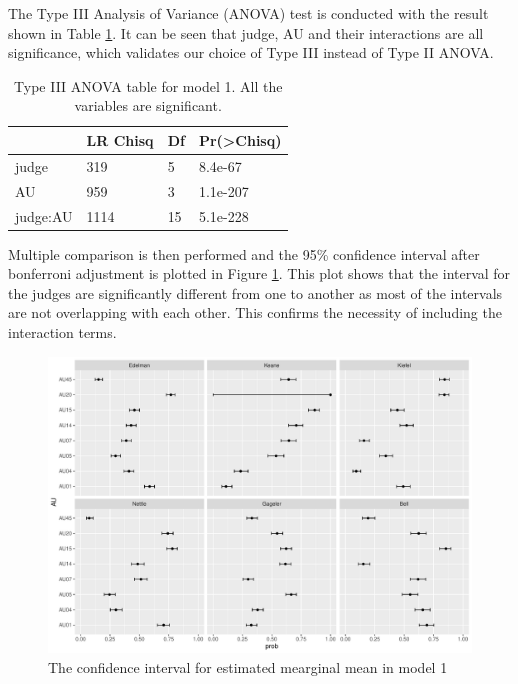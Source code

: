 \documentclass{monashthesis}
\begin{document}
The Type III Analysis of Variance (ANOVA) test is conducted with the result shown in Table \ref{tab:anova}. It can be seen that judge, AU and their interactions are all significance, which validates our choice of Type III instead of Type II ANOVA.

\begin{table}

\caption{\label{tab:anova}\label{tab:anova}Type III ANOVA table for model 1. All the variables are significant.}
\centering
\begin{tabular}[t]{l|l|l|l}
\hline
  & LR Chisq & Df & Pr(>Chisq)\\
\hline
judge & 319 & 5 & 8.4e-67\\
\hline
AU & 959 & 3 & 1.1e-207\\
\hline
judge:AU & 1114 & 15 & 5.1e-228\\
\hline
\end{tabular}
\end{table}

Multiple comparison is then performed and the 95\% confidence interval after bonferroni adjustment is plotted in Figure \ref{fig:model1-plot}. This plot shows that the interval for the judges are significantly different from one to another as most of the intervals are not overlapping with each other. This confirms the necessity of including the interaction terms.

\begin{figure}

{\centering \includegraphics[width=1\linewidth]{figures/model1-plot-1} 

}

\caption{The confidence interval for estimated mearginal mean in model 1}\label{fig:model1-plot}
\end{figure}
\end{document}
